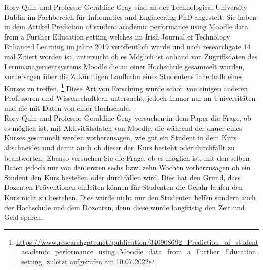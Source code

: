 Rory Quin und Professor Geraldine Gray sind an der \glqq Technological University Dublin\grqq{} im Fachbereich für \glqq Informatics and Engineering
PhD \grqq{} angestelt. Sie haben in dem Artikel \glqq Prediction of student academic performance using Moodle data from a Further Education setting\grqq{} welches im Irish Journal of Technology Enhanced Learning im jahre 2019 veröffentlich wurde und nach researchgate 14 mal Zitiert worden ist, untersucht ob es Möglich ist anhand von Zugriffsdaten des Lernmanagementsystems Moodle die an einer Hochschule gesammelt wurden,
vorhersagen über die Zukünftigen Laufbahn eines Studentens innerhalb eines Kurses zu treffen. \footnote{\url{https://www.researchgate.net/publication/340908692_Prediction_of_student_academic_performance_using_Moodle_data_from_a_Further_Education_setting}, zuletzt aufgerufen am 10.07.2022} Diese Art von Forschung wurde schon von einigen anderen Professoren und Wissenschaftlern untersucht, jedoch immer nur an Universitäten und nie mit Daten von einer Hochschule. \cite[S. 5]{Quinn.2020}
\\ \noindent
Rory Quin und Professor Geraldine Gray versuchen in dem Paper die Frage, ob es möglich ist, mit Aktivitätsdaten von Moodle, die während der dauer eines Kurses gesammelt werden vorherzusagen, wie gut ein Student in dem Kurs abschneidet und damit auch ob dieser den Kurs besteht oder durchfällt zu beantworten. 
Ebenso versuchen Sie die Frage, ob es möglich ist, mit den selben Daten jedoch nur von den ersten sechs bzw. zehn Wochen vorherzusagen ob ein Student den Kurs bestehen oder durchfallen wird. \cite[S. 5]{Quinn.2020}
Dies hat den Grund, dass Dozenten Präventionen einleiten können für Studenten die Gefahr laufen den Kurs nicht zu bestehen. Dies würde nicht nur den Studenten helfen sondern auch der Hochschule und dem Dozenten, denn diese würde langfristig den Zeit und Geld sparen. \cite[S. 15]{Quinn.2020}

